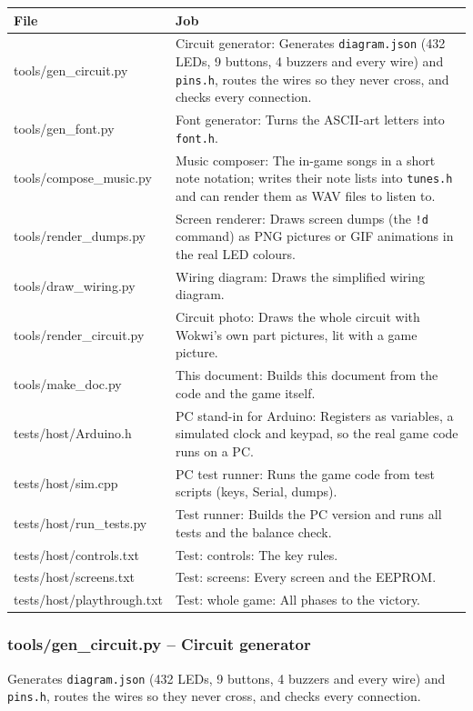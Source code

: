 \documentclass[11pt,a4paper]{article}
\begin{document}
{\footnotesize\begin{longtable}{|>{\raggedright\arraybackslash}p{4.85cm}|>{\raggedright\arraybackslash}p{11.65cm}|}
\hline\rowcolor{accent}\textbf{\color{white}File} & \textbf{\color{white}Job}\\\hline\endhead
tools/gen\_circuit.py & Circuit generator: Generates \texttt{diagram.json} (432 LEDs, 9 buttons, 4 buzzers and every wire) and \texttt{pins.h}, routes the wires so they never cross, and checks every connection.\\\hline
\rowcolor{rowshade}tools/gen\_font.py & Font generator: Turns the ASCII-art letters into \texttt{font.h}.\\\hline
tools/compose\_music.py & Music composer: The in-game songs in a short note notation; writes their note lists into \texttt{tunes.h} and can render them as WAV files to listen to.\\\hline
\rowcolor{rowshade}tools/render\_dumps.py & Screen renderer: Draws screen dumps (the \texttt{!d} command) as PNG pictures or GIF animations in the real LED colours.\\\hline
tools/draw\_wiring.py & Wiring diagram: Draws the simplified wiring diagram.\\\hline
\rowcolor{rowshade}tools/render\_circuit.py & Circuit photo: Draws the whole circuit with Wokwi's own part pictures, lit with a game picture.\\\hline
tools/make\_doc.py & This document: Builds this document from the code and the game itself.\\\hline
\rowcolor{rowshade}tests/host/Arduino.h & PC stand-in for Arduino: Registers as variables, a simulated clock and keypad, so the real game code runs on a PC.\\\hline
tests/host/sim.cpp & PC test runner: Runs the game code from test scripts (keys, Serial, dumps).\\\hline
\rowcolor{rowshade}tests/host/run\_tests.py & Test runner: Builds the PC version and runs all tests and the balance check.\\\hline
tests/host/controls.txt & Test: controls: The key rules.\\\hline
\rowcolor{rowshade}tests/host/screens.txt & Test: screens: Every screen and the EEPROM.\\\hline
tests/host/playthrough.txt & Test: whole game: All phases to the victory.\\\hline
\end{longtable}}

\subsubsection*{tools/gen\_circuit.py – Circuit generator}
Generates \texttt{diagram.json} (432 LEDs, 9 buttons, 4 buzzers and every wire) and \texttt{pins.h}, routes the wires so they never cross, and checks every connection.
\end{document}
